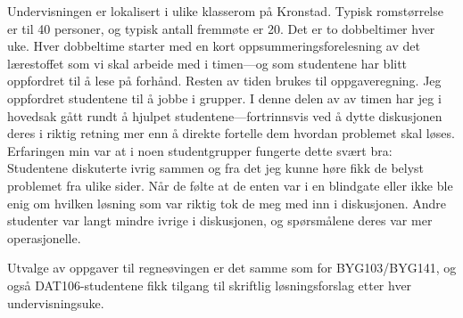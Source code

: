 \documentclass[a4paper,norsk,12pt]{report}
\begin{document}
Undervisningen er lokalisert i ulike klasserom på Kronstad. Typisk romstørrelse er til 40 personer, og typisk antall fremmøte er 20. Det er to dobbeltimer hver uke. Hver dobbeltime starter med en kort oppsummeringsforelesning av det lærestoffet som vi skal arbeide med i timen---og som studentene har blitt oppfordret til å lese på forhånd. Resten av tiden brukes til oppgaveregning. Jeg oppfordret studentene til å jobbe i grupper. I denne delen av av timen har jeg i hovedsak gått rundt å hjulpet studentene---fortrinnsvis ved å dytte diskusjonen deres i riktig retning mer enn å direkte fortelle dem hvordan problemet skal løses. Erfaringen min var at i noen studentgrupper fungerte dette svært bra: Studentene diskuterte ivrig sammen og fra det jeg kunne høre fikk de belyst problemet fra ulike sider. Når de følte at de enten var i en blindgate eller ikke ble enig om hvilken løsning som var riktig tok de meg med inn i diskusjonen. Andre studenter var langt mindre ivrige i diskusjonen, og spørsmålene deres var mer operasjonelle.

Utvalge av oppgaver til regneøvingen er det samme som for BYG103/BYG141, og også DAT106-studentene fikk tilgang til skriftlig løsningsforslag etter hver undervisningsuke. 
\end{document}

